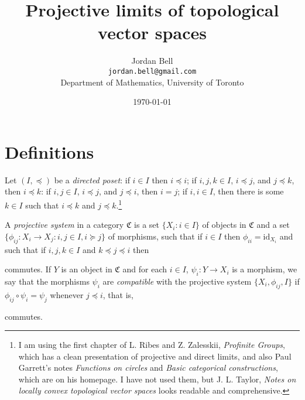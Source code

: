 \documentclass{article}
\newcommand{\id}{\textrm{id}}
\begin{document}
\title{Projective limits of topological vector spaces}
\author{Jordan Bell\\ \texttt{jordan.bell@gmail.com}\\Department of Mathematics, University of Toronto}
\date{\today}

\maketitle


\section{Definitions}
Let $(I,\preceq)$ be a {\em directed poset}: if $i \in I$ then $i \preceq i$; if $i,j,k \in I$, $i \preceq j$, and $j \preceq k$, then $i \preceq k$: if $i,j \in I$, $i \preceq j$, and $j \preceq i$, then $i=j$; if
$i,i \in I$, then there is some $k \in I$ such that $i \preceq k$ and $j \preceq k$.\footnote{I am using the first chapter of L. Ribes and Z. Zalesskii, {\em Profinite Groups}, which has
a clean presentation of projective and direct limits, and
also Paul Garrett's notes {\em Functions on circles} and {\em Basic categorical constructions}, which are on his homepage. I have not used them,
but J. L. Taylor, {\em Notes on locally convex topological vector spaces} looks readable and comprehensive.}

A {\em projective system} in a category $\mathfrak{C}$ is a set $\{X_i:i \in I\}$ of objects in $\mathfrak{C}$ and a set $\{\phi_{ij}:X_i \to X_j:i,j \in I, i \succeq j\}$ of morphisms, such that
if $i \in I$ then $\phi_{ii}=\id_{X_i}$  and such that
if $i,j,k \in I$ and $k \preceq j \preceq i$ then
\begin{center}
\end{center}
commutes.
If $Y$ is an object in $\mathfrak{C}$ and for each $i \in I$, $\psi_i:Y \to X_i$ is a morphism, we say that the morphisms $\psi_i$ are {\em compatible}
with the projective system $\{X_i,\phi_{ij},I\}$ if $\phi_{ij} \circ \psi_i = \psi_j$ whenever $j \preceq i$, that is, 
\begin{center}
\end{center}
commutes.
\end{document}

